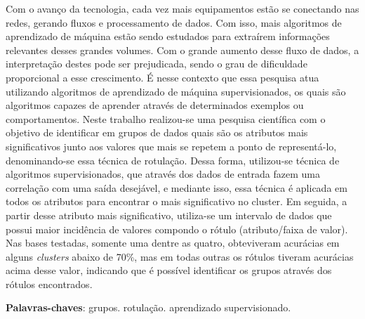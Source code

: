 \begin{resumo}
Com o avanço da tecnologia, cada vez mais equipamentos estão se conectando nas redes, gerando fluxos e processamento de dados. Com isso, mais algoritmos de aprendizado de máquina estão sendo estudados para extraírem informações relevantes desses grandes volumes. Com o grande aumento desse fluxo de dados, a interpretação destes pode ser prejudicada, sendo o grau de dificuldade proporcional a esse crescimento. É nesse contexto que essa pesquisa atua utilizando algoritmos de aprendizado de máquina supervisionados, os quais são algoritmos capazes de aprender através de determinados exemplos ou comportamentos. Neste trabalho realizou-se uma pesquisa científica com o objetivo de identificar em grupos de dados quais são os atributos mais significativos junto aos valores que mais se repetem a ponto de representá-lo, denominando-se essa técnica de rotulação. Dessa forma, utilizou-se técnica de algoritmos supervisionados, que através dos dados de entrada fazem uma correlação com uma saída desejável, e mediante isso, essa técnica é aplicada em todos os atributos para encontrar o mais significativo no cluster. Em seguida, a partir desse atributo mais significativo, utiliza-se um intervalo de dados que possui  maior incidência de valores  compondo o rótulo (atributo/faixa de valor). Nas bases testadas, somente uma dentre as quatro, obteviveram acurácias em alguns \textit{clusters} abaixo de 70\%, mas em todas outras os rótulos tiveram acurácias acima desse valor, indicando que é possível identificar os grupos através dos rótulos encontrados.





  \textbf{Palavras-chaves}: grupos. rotulação. aprendizado supervisionado. 
\end{resumo}

